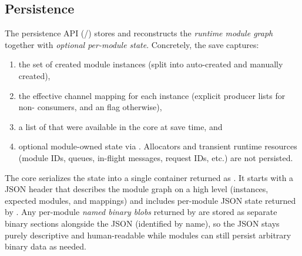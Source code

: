 \subsection{Persistence} \label{subsec:ch3_core_persistence}

The persistence API (/) stores and reconstructs the \emph{runtime module graph} together with \emph{optional per-module state}. Concretely, the save captures: 

\begin{enumerate}[label=(\roman*)]
    \item the set of created module instances (split into auto-created and manually created),
    \item the effective channel mapping for each instance (explicit producer lists for non- consumers, and an  flag otherwise),
    \item a list of  that were available in the core at save time, and
    \item optional module-owned state via . Allocators and transient runtime resources (module IDs, queues, in-flight messages, request IDs, etc.) are not persisted.
\end{enumerate}

The core serializes the state into a single container returned as .
It starts with a JSON header that describes the module graph on a high level (instances, expected modules, and mappings) and includes per-module JSON state returned by .
Any per-module \emph{named binary blobs} returned by  are stored as separate binary sections alongside the JSON (identified by name), so the JSON stays purely descriptive and human-readable while modules can still persist arbitrary binary data as needed.

